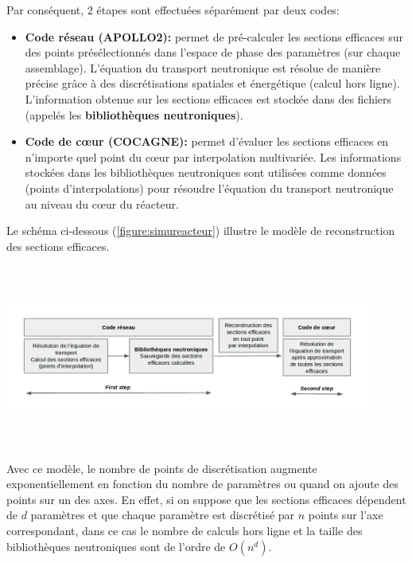 Par conséquent, 2 étapes sont effectuées séparément par deux codes:
\begin{itemize}
\item \textbf{Code réseau (APOLLO2):} permet de pré-calculer les sections efficaces sur des points présélectionnés dans l'espace de phase des paramètres (sur chaque assemblage). L'équation du transport neutronique est résolue de manière précise grâce à des discrétisations spatiales et énergétique (calcul hors ligne). L'information obtenue sur les sections efficaces est stockée dans des fichiers (appelés les \textbf{bibliothèques neutroniques}).
\item \textbf{Code de cœur (COCAGNE):} permet d'évaluer les sections efficaces en n'importe quel point du cœur par interpolation multivariée. Les informations stockées dans les bibliothèques neutroniques sont utilisées comme données (points d'interpolations) pour résoudre l'équation du transport neutronique au niveau du cœur du réacteur.
\end{itemize}
Le schéma ci-dessous (\ref{figure:simureacteur}) illustre le modèle de reconstruction des sections efficaces.
\begin{center}
\includegraphics[height=6cm,width=12cm]{images/figure1.png}
\label{figure:simureacteur}
\end{center}

\hspace{0.5cm}
Avec ce modèle, le nombre de points de discrétisation augmente exponentiellement en fonction du nombre de paramètres ou quand on ajoute des points sur un des axes. En effet, si on suppose que les sections efficaces dépendent de $d$ paramètres et que chaque paramètre est discrétisé par $n$ points sur l'axe correspondant, dans ce cas le nombre de calculs hors ligne et la taille des bibliothèques neutroniques sont de l'ordre de $O(n^d)$.

